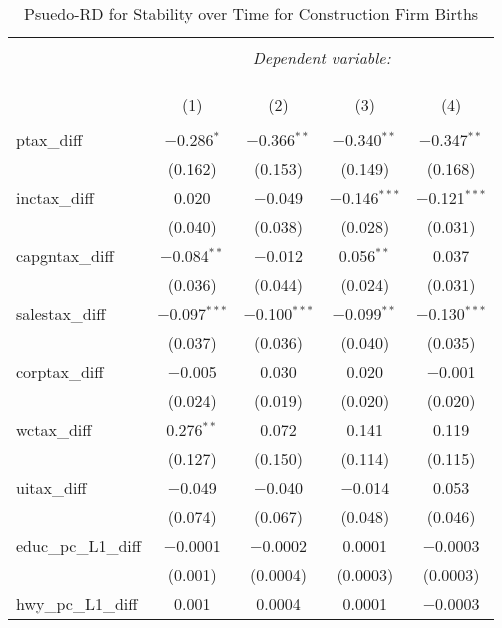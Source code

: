 
\begin{table}[!htbp] \centering 
  \caption{Psuedo-RD for Stability over Time for  Construction Firm Births} 
  \label{} 
\begin{tabular}{@{\extracolsep{5pt}}lcccc} 
\\[-1.8ex]\hline 
\hline \\[-1.8ex] 
 & \multicolumn{4}{c}{\textit{Dependent variable:}} \\ 
\cline{2-5} 
\\[-1.8ex] & \multicolumn{4}{c}{ } \\ 
\\[-1.8ex] & (1) & (2) & (3) & (4)\\ 
\hline \\[-1.8ex] 
 ptax\_diff & $-$0.286$^{*}$ & $-$0.366$^{**}$ & $-$0.340$^{**}$ & $-$0.347$^{**}$ \\ 
  & (0.162) & (0.153) & (0.149) & (0.168) \\ 
  inctax\_diff & 0.020 & $-$0.049 & $-$0.146$^{***}$ & $-$0.121$^{***}$ \\ 
  & (0.040) & (0.038) & (0.028) & (0.031) \\ 
  capgntax\_diff & $-$0.084$^{**}$ & $-$0.012 & 0.056$^{**}$ & 0.037 \\ 
  & (0.036) & (0.044) & (0.024) & (0.031) \\ 
  salestax\_diff & $-$0.097$^{***}$ & $-$0.100$^{***}$ & $-$0.099$^{**}$ & $-$0.130$^{***}$ \\ 
  & (0.037) & (0.036) & (0.040) & (0.035) \\ 
  corptax\_diff & $-$0.005 & 0.030 & 0.020 & $-$0.001 \\ 
  & (0.024) & (0.019) & (0.020) & (0.020) \\ 
  wctax\_diff & 0.276$^{**}$ & 0.072 & 0.141 & 0.119 \\ 
  & (0.127) & (0.150) & (0.114) & (0.115) \\ 
  uitax\_diff & $-$0.049 & $-$0.040 & $-$0.014 & 0.053 \\ 
  & (0.074) & (0.067) & (0.048) & (0.046) \\ 
  educ\_pc\_L1\_diff & $-$0.0001 & $-$0.0002 & 0.0001 & $-$0.0003 \\ 
  & (0.001) & (0.0004) & (0.0003) & (0.0003) \\ 
  hwy\_pc\_L1\_diff & 0.001 & 0.0004 & 0.0001 & $-$0.0003 \\ 

\end{tabular}
\end{table}
